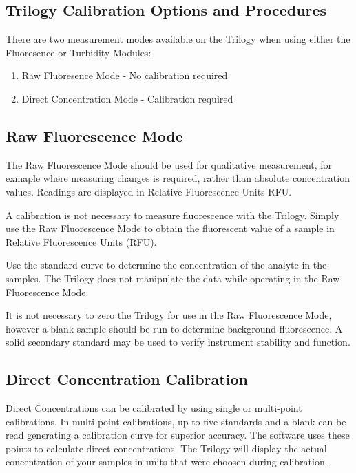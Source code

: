 \documentclass[12pt]{../SOP4_alpha}\usepackage[]{graphicx}\usepackage[]{color}
\begin{document}
\subsection{Trilogy Calibration Options and Procedures}

\NP There are two measurement modes available on the Trilogy when using either the Fluoresence or Turbidity Modules:

\begin{enumerate}
  \item Raw Fluoresence Mode - No calibration required
  \item Direct Concentration Mode - Calibration required 
\end{enumerate}

\subsection{Raw Fluorescence Mode}

\NP The Raw Fluorescence Mode should be used for qualitative measurement, for exmaple where measuring changes is required, rather than absolute concentration values. Readings are displayed in Relative Fluorescence Units RFU.

\NP A calibration is not necessary to measure fluorescence with the Trilogy. Simply use the Raw Fluorescence Mode to obtain the fluorescent value of a sample in Relative Fluorescence Units (RFU). 

\NP Use the standard curve to determine the concentration of the analyte in the samples. The Trilogy does not manipulate the data while operating in the Raw Fluorescence Mode. 

\NP It is not necessary to zero the Trilogy for use in the Raw Fluorescence Mode, however a blank sample should be run to determine background fluorescence. A solid secondary standard may be used to verify instrument stability and function.

\subsection{Direct Concentration Calibration}

\NP Direct Concentrations can be calibrated by using single or multi-point calibrations. In multi-point calibrations, up to five standards and a blank can be read generating a calibration curve for superior accuracy. The software uses these points to calculate direct concentrations. The Trilogy will display the actual concentration of your samples in units that were choosen during calibration. 
\end{document}
